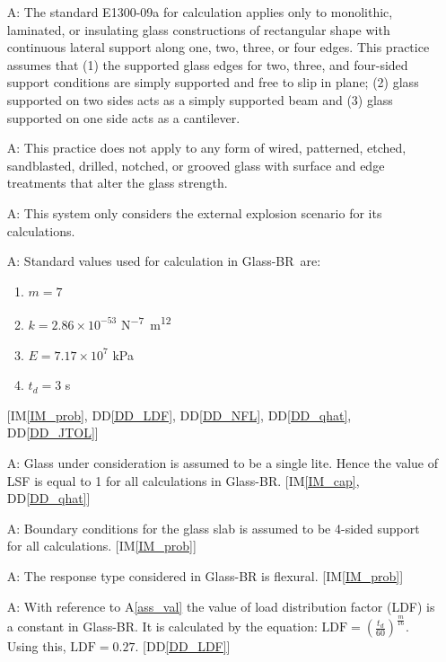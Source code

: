 \documentclass[12pt]{article}
\newcommand{\ddref}[1]{DD\ref{#1}}
\newcounter{assumpnum} %
\newcommand{\iref}[1]{IM\ref{#1}}
\newcommand{\progname}{Glass-BR}
\begin{document}
\begin{enumerate}

\item[A\refstepcounter{assumpnum}\theassumpnum \label{A_Glass}:] The standard E1300-09a for
  calculation applies only to monolithic, laminated, or insulating glass
  constructions of rectangular shape with continuous lateral support along one,
  two, three, or four edges.  This practice assumes that (1) the supported glass
  edges for two, three, and four-sided support conditions are simply supported
  and free to slip in plane; (2) glass supported on two sides acts as a simply
  supported beam and (3) glass supported on one side acts as a cantilever.

\item[A\refstepcounter{assumpnum}\theassumpnum \label{A_N/AGlass}:] This practice does not apply to
  any form of wired, patterned, etched, sandblasted, drilled, notched, or grooved
  glass with surface and edge treatments that alter the glass strength.

\item [A\refstepcounter{assumpnum}\theassumpnum \label{A_External}:] This system
  only considers the external explosion scenario for its calculations.

\item[A\refstepcounter{assumpnum}\theassumpnum \label{ass_val}:] Standard values
  used for calculation in \progname\ are:

   \begin{enumerate}
   \item $m=7$
   \item $k=2.86 \times 10^{-53}$ \si{\newton^{-7}\meter^{12}}
   \item $E=7.17 \times 10^7$ \si{\kilo\pascal}
   \item $t_d=3$ \si{\second}
   \end{enumerate}
[\iref{IM_prob}, \ddref{DD_LDF}, \ddref{DD_NFL}, \ddref{DD_qhat}, \ddref{DD_JTOL}]

\item[A\refstepcounter{assumpnum}\theassumpnum \label{A_LSF}:] Glass under
  consideration is assumed to be a single lite.  Hence the value of LSF is equal
  to 1 for all calculations in \progname.  [\iref{IM_cap}, \ddref{DD_qhat}]

\item[A\refstepcounter{assumpnum}\theassumpnum \label{A_BC}:] Boundary
  conditions for the glass slab is assumed to be 4-sided support for all
  calculations.  [\iref{IM_prob}]

 \item[A\refstepcounter{assumpnum}\theassumpnum \label{A_Flex}:] The response
   type considered in \progname{} is flexural.  [\iref{IM_prob}]

 \item[A\refstepcounter{assumpnum}\theassumpnum \label{A_LDF}:] With reference
   to A\ref{ass_val} the value of load distribution factor (LDF) is a constant
   in \progname.  It is calculated by the equation:
   $\text{LDF}=(\frac{t_d}{60})^{\frac{m}{16}}$. Using this,
   $\text{LDF} = 0.27$. [\ddref{DD_LDF}]

\end{enumerate}
\end{document}
